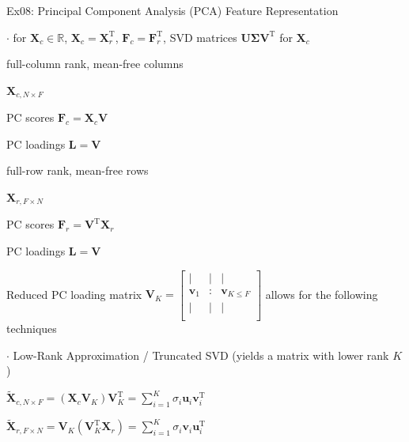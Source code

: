 \documentclass[mathserif, aspectratio=1610]{intbeamer}
\begin{document}
\begin{frame}[t]{Ex08: Principal Component Analysis (PCA) Feature Representation}

$\cdot$ for $\bm{X}_c \in\mathbb{R}$, $\bm{X}_c = \bm{X}_r^\mathrm{T}$, $\bm{F}_c = \bm{F}_r^\mathrm{T}$, SVD matrices $\bm{U} \bm{\Sigma} \bm{V}^\mathrm{T}$ for $\bm{X}_c$

\begin{minipage}[t]{0.49\textwidth}
full-column rank, mean-free columns

$\bm{X}_{c,N \times F}$

PC scores $\bm{F}_c = \bm{X}_c \bm{V}$

PC loadings $\bm{L} = \bm{V}$

\end{minipage}
%
\begin{minipage}[t]{0.49\textwidth}
full-row rank, mean-free rows

$\bm{X}_{r,F \times N}$

PC scores $\bm{F}_r = \bm{V}^\mathrm{T} \bm{X}_r$

PC loadings $\bm{L} = \bm{V}$

\end{minipage}

\vspace{1em}

Reduced PC loading matrix
$\bm{V}_K =
\begin{bmatrix}
| & | & |\\
\bm{v}_1 & : & \bm{v}_{K \leq F}\\
| & | & |\\
\end{bmatrix}
$
allows for the following techniques

\vspace{1em}

$\cdot$ Low-Rank Approximation / Truncated SVD (yields a matrix with lower rank $K$)

\begin{minipage}[t]{0.49\textwidth}

$\tilde{\bm{X}}_{c,N \times F} = (\bm{X}_c \bm{V}_K) \bm{V}_K^\mathrm{T} = \sum_{i=1}^{K} \sigma_i \bm{u}_i \bm{v}_i^\mathrm{T}$

\end{minipage}
%
\begin{minipage}[t]{0.49\textwidth}

$\tilde{\bm{X}}_{r,F \times N} = \bm{V}_K (\bm{V}_K^\mathrm{T} \bm{X}_r) = \sum_{i=1}^{K} \sigma_i \bm{v}_i \bm{u}_i^\mathrm{T}$


\end{minipage}
\end{frame}
\end{document}
